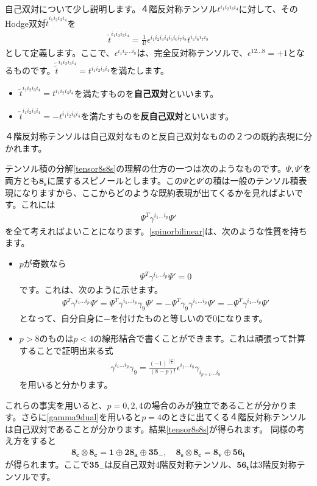 \documentclass[report,paper=a4, fontsize=12pt, line_length=16cm, number_of_lines=34,dvipdfmx]{jlreq}
\numberwithin{equation}{chapter}
\numberwithin{equation}{section}
\newcommand{\kyou}[1]{{\sffamily \bfseries #1}}
\newcommand{\triv}{\mathbf{1}}
\newcommand{\etv}{\mathbf{8_v}}
\newcommand{\ets}{\mathbf{8_s}}
\newcommand{\etc}{\mathbf{8_c}}
\newcommand{\tweta}{\mathbf{28_{a}}}
\newcommand{\thfvm}{\mathbf{35}_{-}}
\newcommand{\fsxt}{\mathbf{56_t}}
\begin{document}
自己双対について少し説明します。４階反対称テンソル$t^{i_1i_2i_3i_4}$に対して、そのHodge双対$\tilde{t}^{i_1i_2i_3i_4}$を
\begin{align}
  \tilde{t}^{i_1i_2i_3i_4}=\frac{1}{4!}\epsilon^{i_1i_2i_3i_4i_5i_6i_7i_8}t^{i_5i_6i_7i_8}
\end{align}
として定義します。ここで、$\epsilon^{i_1i_2\dots i_8}$は、完全反対称テンソルで、$\epsilon^{12\dots 8}=+1$となるものです。$\tilde{\tilde{t}}^{i_1i_2i_3i_4}=t^{i_1i_2i_3i_4}$を満たします。
\begin{itemize}
  \item $\tilde{t}^{i_1i_2i_3i_4}=t^{i_1i_2i_3i_4}$を満たすものを\kyou{自己双対}といいます。
  \item $\tilde{t}^{i_1i_2i_3i_4}=-t^{i_1i_2i_3i_4}$を満たすものを\kyou{反自己双対}といいます。
\end{itemize}
４階反対称テンソルは自己双対なものと反自己双対なものの２つの既約表現に分かれます。

テンソル積の分解\eqref{tensor8s8s}の理解の仕方の一つは次のようなものです。$\Psi,\Psi'$を両方とも$\ets$に属するスピノールとします。この$\Psi$と$\Psi'$の積は一般のテンソル積表現になりますから、ここからどのような既約表現が出てくるかを見ればよいです。これには
\begin{align}
  \Psi^{T}\gamma^{i_1\dots i_p}\Psi'
  \label{spinorbilinear}
\end{align}
を全て考えればよいことになります。\eqref{spinorbilinear}は、次のような性質を持ちます。
\begin{itemize}
  \item $p$が奇数なら
  \begin{align}
    \Psi^{T}\gamma^{i_1\dots i_p}\Psi'=0
  \end{align}
  です。これは、次のように示せます。
  \begin{align}
    \Psi^{T}\gamma^{i_1\dots i_p}\Psi'=
    \Psi^{T}\gamma^{i_1\dots i_p}\gamma_9\Psi'=
    -\Psi^{T}\gamma_9\gamma^{i_1\dots i_p}\Psi'=
    -\Psi^{T}\gamma^{i_1\dots i_p}\Psi'
  \end{align}
  となって、自分自身に$-$を付けたものと等しいので$0$になります。
  \item $p>8$のものは$p<4$の線形結合で書くことができます。これは頑張って計算することで証明出来る式
  \begin{align}
    \gamma^{i_1\dots i_p}\gamma_9=\frac{(-1)^{[\frac{p}{2}]}}{(8-p)!}\epsilon^{i_1\dots i_8}\gamma_{i_{p+1}\dots i_8}\label{gamma9dual}
  \end{align}
  を用いると分かります。
\end{itemize}
これらの事実を用いると、$p=0,2,4$の場合のみが独立であることが分かります。さらに\eqref{gamma9dual}を用いると$p=4$のときに出てくる４階反対称テンソルは自己双対であることが分かります。結果\eqref{tensor8s8s}が得られます。
同様の考え方をすると
\begin{align}
  \etc\otimes\etc=\triv \oplus \tweta \oplus \thfvm,\quad
  \ets\otimes\etc=\etv \oplus \fsxt
  \label{otherspinortensors}
\end{align}
が得られます。ここで$\thfvm$は反自己双対4階反対称テンソル、$\fsxt$は3階反対称テンソルです。
\end{document}

